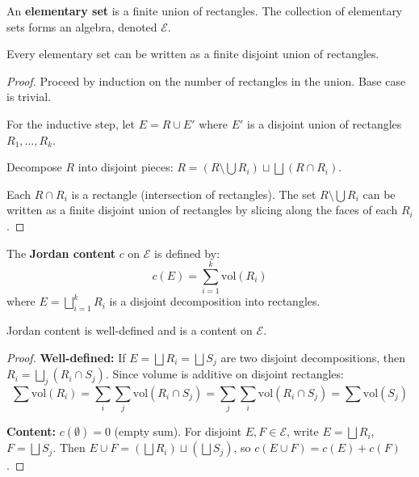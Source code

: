 \begin{definition}
An \textbf{elementary set} is a finite union of rectangles. The collection of elementary sets forms an algebra, denoted $\mathcal{E}$.
\end{definition}

\begin{proposition}
Every elementary set can be written as a finite disjoint union of rectangles.
\end{proposition}

\begin{proof}
Proceed by induction on the number of rectangles in the union. Base case is trivial.

For the inductive step, let $E = R \cup E'$ where $E'$ is a disjoint union of rectangles $R_1, \ldots, R_k$.

Decompose $R$ into disjoint pieces: $R = (R \setminus \bigcup R_i) \sqcup \bigsqcup (R \cap R_i)$.

Each $R \cap R_i$ is a rectangle (intersection of rectangles). The set $R \setminus \bigcup R_i$ can be written as a finite disjoint union of rectangles by slicing along the faces of each $R_i$.
\end{proof}

\begin{definition}
The \textbf{Jordan content} $c$ on $\mathcal{E}$ is defined by:
\[ c(E) = \sum_{i=1}^k \text{vol}(R_i) \]
where $E = \bigsqcup_{i=1}^k R_i$ is a disjoint decomposition into rectangles.
\end{definition}

\begin{proposition}
Jordan content is well-defined and is a content on $\mathcal{E}$.
\end{proposition}

\begin{proof}
\textbf{Well-defined:} If $E = \bigsqcup R_i = \bigsqcup S_j$ are two disjoint decompositions, then $R_i = \bigsqcup_j (R_i \cap S_j)$. Since volume is additive on disjoint rectangles:
\[ \sum \text{vol}(R_i) = \sum_i \sum_j \text{vol}(R_i \cap S_j) = \sum_j \sum_i \text{vol}(R_i \cap S_j) = \sum \text{vol}(S_j) \]

\textbf{Content:} $c(\emptyset) = 0$ (empty sum). For disjoint $E, F \in \mathcal{E}$, write $E = \bigsqcup R_i$, $F = \bigsqcup S_j$. Then $E \cup F = (\bigsqcup R_i) \sqcup (\bigsqcup S_j)$, so $c(E \cup F) = c(E) + c(F)$.
\end{proof}

